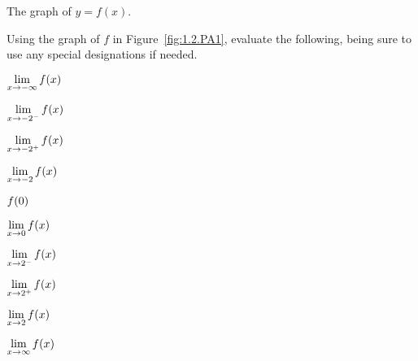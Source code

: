 \begin{marginfigure}[6cm]
\caption{The graph of $y = f(x)$.} \label{fig:1.2.PA1}
\end{marginfigure}

\begin{pa} \label{PA:1.2}
Using the graph of $f$ in Figure~\ref{fig:1.2.PA1}, evaluate the following, being sure to use any special designations if needed.

\begin{multicols}{2}
\ba
\item $\displaystyle \lim_{x \to -\infty} f(x)$
\item $\displaystyle \lim_{x \to -2^-} f(x)$
\item $\displaystyle \lim_{x \to -2^+} f(x)$
\item $\displaystyle \lim_{x \to -2} f(x)$
\item $\displaystyle f(0)$
\item $\displaystyle \lim_{x \to 0} f(x)$
\item $\displaystyle \lim_{x \to 2^-} f(x)$
\item $\displaystyle \lim_{x \to 2^+} f(x)$
\item $\displaystyle \lim_{x \to 2} f(x)$
\item $\displaystyle \lim_{x \to \infty} f(x)$
\ea
\end{multicols}
\end{pa} 

\afterpa

